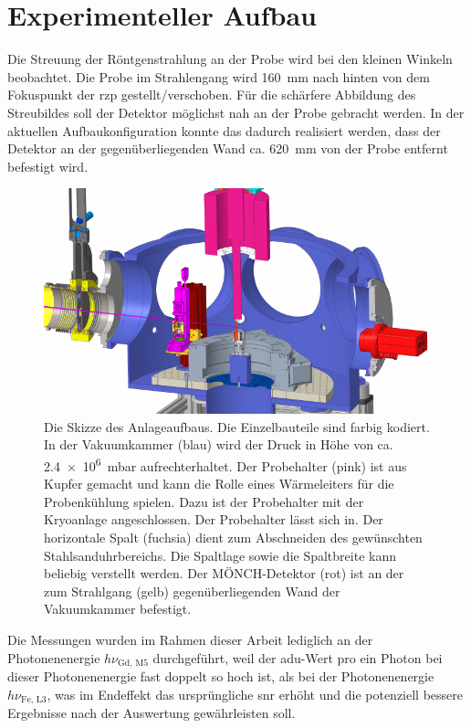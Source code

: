 \chapter{Experimenteller Aufbau}
Die Streuung der Röntgenstrahlung an der Probe wird bei den kleinen Winkeln beobachtet. Die Probe im Strahlengang wird \SI{160}{\milli\meter} nach hinten von dem Fokuspunkt der \gls{rzp} gestellt/verschoben. Für die schärfere Abbildung des Streubildes soll der Detektor möglichst nah an der Probe gebracht werden. In der aktuellen Aufbaukonfiguration konnte das dadurch realisiert werden, dass der Detektor an der gegenüberliegenden Wand ca. \SI{620}{\milli\meter} von der Probe entfernt befestigt wird.
\begin{figure}[H]
    \centering
    \includegraphics{images/aufbau/aufbau_empty.pdf}
    \caption{Die Skizze des Anlageaufbaus. Die Einzelbauteile sind farbig kodiert. In der Vakuumkammer (blau) wird der Druck in Höhe von ca. \SI{2.4e6}{\milli\bar} aufrechterhaltet. Der Probehalter (pink) ist aus Kupfer gemacht und kann die Rolle eines Wärmeleiters für die Probenkühlung spielen. Dazu ist der Probehalter mit der Kryoanlage angeschlossen. Der Probehalter lässt sich in. Der horizontale Spalt (fuchsia) dient zum Abschneiden des gewünschten Stahlsanduhrbereichs. Die Spaltlage sowie die Spaltbreite kann beliebig verstellt werden. Der MÖNCH-Detektor (rot) ist an der zum Strahlgang (gelb) gegenüberliegenden Wand der Vakuumkammer befestigt.}
    \label{fig:anlage}
\end{figure}
\noindent
Die Messungen wurden im Rahmen dieser Arbeit lediglich an der Photonenenergie $h\nu_\text{Gd, M5}$ durchgeführt, weil der \gls{adu}-Wert pro ein Photon bei dieser Photonenenergie fast doppelt so hoch ist, als bei der Photonenenergie $h\nu_\text{Fe, L3}$, was im Endeffekt das ursprüngliche \gls{snr} erhöht und die potenziell bessere Ergebnisse nach der Auswertung gewährleisten soll.

